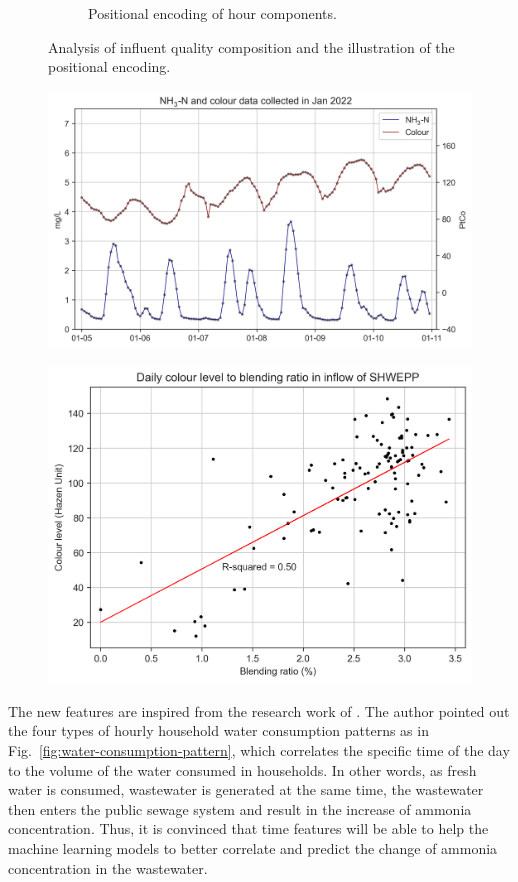 \begin{figure}[h]
\begin{subfigure}[t]{0.45\textwidth}
      \caption{Positional encoding of hour components.} \label{fig:pos-encoding}
    \end{subfigure}%
  \caption{Analysis of influent quality composition and the illustration of the positional encoding.} \label{fig:blend-pos}
\end{figure}

\begin{figure}[h]
  \centering
  \includegraphics[width=0.8\columnwidth]{imgs/results/colour-pattern.png}
  \caption{}
  \label{fig:color-to-nh3-pattern}
\end{figure}

\begin{figure}[h]
  \centering
  \includegraphics[width=0.8\columnwidth]{imgs/leachate-effluent-blend-ratio-color-plot/colour-blend-coef.png}
  \caption{}
  \label{fig:blend-colour-coef}
\end{figure}

The new features are inspired from the research work of \citet{abu-bakarQuantifyingImpactCOVID192021}. The author pointed out the four types of hourly household water consumption patterns as in Fig.~\ref{fig:water-consumption-pattern}, which correlates the specific time of the day to the volume of the water consumed in households. In other words, as fresh water is consumed, wastewater is generated at the same time, the wastewater then enters the public sewage system and result in the increase of ammonia concentration. Thus, it is convinced that time features will be able to help the machine learning models to better correlate and predict the change of ammonia concentration in the wastewater. 

